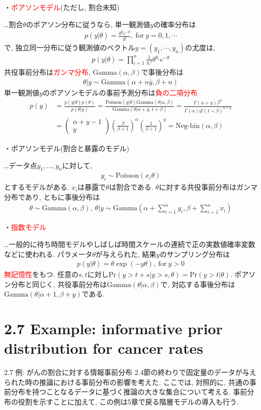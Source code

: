 \documentclass[10pt,dvipdfmx,a4]{beamer}
\newcommand{\eqn}[1]{\begin{align*}#1\end{align*}}
\newcommand{\tcr}[1]{\textcolor{red}{#1}}
\begin{document}
\begin{frame}[t]
・\tcr{ポアソンモデル}(ただし, 割合未知)

…割合$\theta$のポアソン分布に従うなら, 単一観測値$y$の確率分布は
\eqn{p(y|\theta)=\frac{\theta^ye^{-\theta}}{y!},\ \text{for}\ y=0,1,\cdots}
で, 独立同一分布に従う観測値のベクトル$y=(y_1,\cdots,y_n)$の尤度は,
\eqn{p(y|\theta)=\prod_{i=1}^n\frac{1}{y_i!}\theta^{y_i}e^{-\theta}}
共役事前分布は\tcr{ガンマ分布}, Gamma$(\alpha,\beta)$で事後分布は
\eqn{\theta|y\sim \text{Gamma}(\alpha+n\bar{y},\beta+n)}
単一観測値$y$のポアソンモデルの事前予測分布は\tcr{負の二項分布}
\eqn{p(y)&=\tfrac{p(y|\theta)p(\theta)}{p(\theta|y)}=\tfrac{\text{Poisson}(y|\theta)\text{Gamma}(\theta|\alpha,\beta)}{\text{Gamma}(\theta|\alpha+y,1+\beta)}=\tfrac{\Gamma(\alpha+y)\beta^{\alpha}}{\Gamma(\alpha)y!(1+\beta)^{\alpha+y}}\\
&=\left(\begin{array}{c}\alpha+y-1\\y\end{array}\right) \left(\frac{\beta}{\beta+1}\right)^{\alpha}\left(\frac{1}{\beta+1}\right)^y=\text{Neg-bin}(\alpha,\beta)}
\end{frame}


\begin{frame}[t]
・ポアソンモデル(割合と暴露のモデル)

…データ点$y_1,\dots,y_n$に対して,
\eqn{y_i\sim \text{Poisson}(x_i\theta)}
とするモデルがある.
$x_i$は暴露で$\theta$は割合である.
$\theta$に対する共役事前分布はガンマ分布であり, ともに事後分布は
\eqn{\theta\sim\text{Gamma}(\alpha,\beta),\ \theta|y \sim \text{Gamma}\left(\alpha+\sum_{i=1}^n y_i, \beta+\sum_{i=1}^n x_i\right)}

・\tcr{指数モデル}

…一般的に待ち時間モデルやしばしば時間スケールの連続で正の実数値確率変数などに使われる.
パラメータ$\theta$が与えられた, 結果$y$のサンプリング分布は
\eqn{p(y|\theta)=\theta\exp(-y\theta),\ \text{for}\ y>0}
\tcr{無記憶性}をもつ.
任意の$s, t$に対し$\text{Pr}(y>t+s|y>s,\theta)=\text{Pr}(y>t|\theta)$.
ポアソン分布と同じく, 共役事前分布は$\text{Gamma}(\theta|\alpha,\beta)$で, 対応する事後分布は$\text{Gamma}(\theta|\alpha+1,\beta+y)$である.
\end{frame}

\section{2.7 Example: informative prior distribution for cancer rates}
\begin{frame}{2.7 例: がんの割合に対する情報事前分布}
2.4節の終わりで固定量のデータが与えられた時の推論における事前分布の影響を考えた.
ここでは, 対照的に, 共通の事前分布を持つことなるデータに基づく推論の大きな集合について考える.
事前分布の役割を示すことに加えて, この例は5章で戻る階層モデルの導入も行う.
\end{frame}
\end{document}
